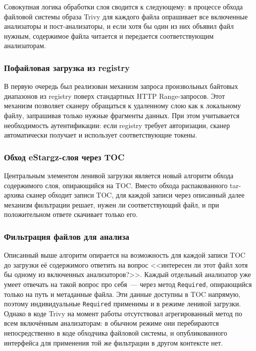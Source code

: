 Совокупная логика обработки слоя сводится к следующему: в процессе обхода файловой системы образа Trivy для каждого файла опрашивает все включенные анализаторы и пост-анализаторы, и если хотя бы один из них объявил файл нужным, содержимое файла читается и передается соответствующим анализаторам.

\subsubsection{Пофайловая загрузка из registry}

В первую очередь был реализован механизм запроса произвольных байтовых диапазонов из registry поверх стандартных HTTP Range-запросов. Этот механизм позволяет сканеру обращаться к удаленному слою как к локальному файлу, запрашивая только нужные фрагменты данных. При этом учитывается необходимость аутентификации: если registry требует авторизации, сканер автоматически получает и использует соответствующие токены.

\subsubsection{Обход eStargz-слоя через TOC}

Центральным элементом ленивой загрузки является новый алгоритм обхода содержимого слоя, опирающийся на TOC. Вместо обхода распакованного tar-архива сканер обходит записи TOC, для каждой записи через описанный далее механизм фильтрации решает, нужен ли соответствующий файл, и при положительном ответе скачивает только его.

\subsubsection{Фильтрация файлов для анализа}

Описанный выше алгоритм опирается на возможность для каждой записи TOC до загрузки её содержимого ответить на вопрос <<интересен ли этот файл хотя бы одному из включенных анализаторов?>>. Каждый отдельный анализатор уже умеет отвечать на такой вопрос про себя~--- через метод \texttt{Required}, опирающийся только на путь и метаданные файла. Эти данные доступны в TOC напрямую, поэтому индивидуальные \texttt{Required} применимы и в режиме ленивой загрузки. Однако в коде Trivy на момент работы отсутствовал агрегированный метод по всем включённым анализаторам: в обычном режиме они перебираются непосредственно в коде обходчика файловой системы, и опубликованного интерфейса для применения той же фильтрации в другом контексте нет.

